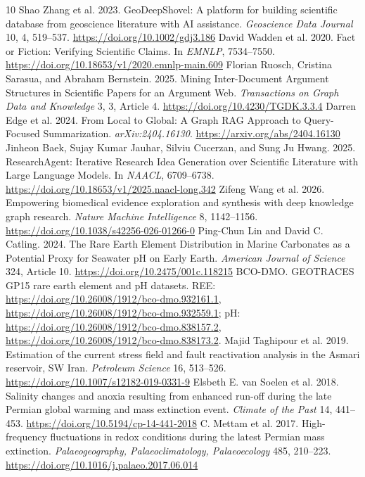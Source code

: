 \documentclass[sigconf,screen,review]{acmart}
\begin{document}
\begin{thebibliography}{10}
Shao Zhang et al. 2023. GeoDeepShovel: A platform for building scientific database from geoscience literature with AI assistance. \emph{Geoscience Data Journal} 10, 4, 519--537. \url{https://doi.org/10.1002/gdj3.186}
David Wadden et al. 2020. Fact or Fiction: Verifying Scientific Claims. In \emph{EMNLP}, 7534--7550. \url{https://doi.org/10.18653/v1/2020.emnlp-main.609}
Florian Ruosch, Cristina Sarasua, and Abraham Bernstein. 2025. Mining Inter-Document Argument Structures in Scientific Papers for an Argument Web. \emph{Transactions on Graph Data and Knowledge} 3, 3, Article 4. \url{https://doi.org/10.4230/TGDK.3.3.4}
Darren Edge et al. 2024. From Local to Global: A Graph RAG Approach to Query-Focused Summarization. \emph{arXiv:2404.16130}. \url{https://arxiv.org/abs/2404.16130}
Jinheon Baek, Sujay Kumar Jauhar, Silviu Cucerzan, and Sung Ju Hwang. 2025. ResearchAgent: Iterative Research Idea Generation over Scientific Literature with Large Language Models. In \emph{NAACL}, 6709--6738. \url{https://doi.org/10.18653/v1/2025.naacl-long.342}
Zifeng Wang et al. 2026. Empowering biomedical evidence exploration and synthesis with deep knowledge graph research. \emph{Nature Machine Intelligence} 8, 1142--1156. \url{https://doi.org/10.1038/s42256-026-01266-0}
Ping-Chun Lin and David C. Catling. 2024. The Rare Earth Element Distribution in Marine Carbonates as a Potential Proxy for Seawater pH on Early Earth. \emph{American Journal of Science} 324, Article 10. \url{https://doi.org/10.2475/001c.118215}
BCO-DMO. GEOTRACES GP15 rare earth element and pH datasets. REE: \url{https://doi.org/10.26008/1912/bco-dmo.932161.1}, \url{https://doi.org/10.26008/1912/bco-dmo.932559.1}; pH: \url{https://doi.org/10.26008/1912/bco-dmo.838157.2}, \url{https://doi.org/10.26008/1912/bco-dmo.838173.2}.
Majid Taghipour et al. 2019. Estimation of the current stress field and fault reactivation analysis in the Asmari reservoir, SW Iran. \emph{Petroleum Science} 16, 513--526. \url{https://doi.org/10.1007/s12182-019-0331-9}
Elsbeth E. van Soelen et al. 2018. Salinity changes and anoxia resulting from enhanced run-off during the late Permian global warming and mass extinction event. \emph{Climate of the Past} 14, 441--453. \url{https://doi.org/10.5194/cp-14-441-2018}
C. Mettam et al. 2017. High-frequency fluctuations in redox conditions during the latest Permian mass extinction. \emph{Palaeogeography, Palaeoclimatology, Palaeoecology} 485, 210--223. \url{https://doi.org/10.1016/j.palaeo.2017.06.014}
\end{thebibliography}
\end{document}
